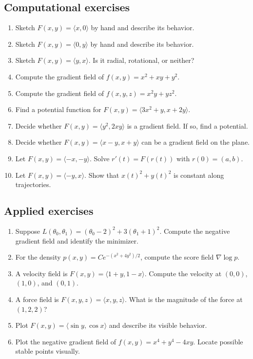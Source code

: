 \documentclass[11pt]{article}
\newcommand{\grad}{\nabla}
\begin{document}
\subsection*{Computational exercises}
\begin{enumerate}
  \item Sketch $F(x,y)=\langle x,0\rangle$ by hand and describe its behavior.
  \item Sketch $F(x,y)=\langle 0,y\rangle$ by hand and describe its behavior.
  \item Sketch $F(x,y)=\langle y,x\rangle$. Is it radial, rotational, or neither?
  \item Compute the gradient field of $f(x,y)=x^2+xy+y^2$.
  \item Compute the gradient field of $f(x,y,z)=x^2y+yz^2$.
  \item Find a potential function for $F(x,y)=\langle 3x^2+y,x+2y\rangle$.
  \item Decide whether $F(x,y)=\langle y^2,2xy\rangle$ is a gradient field. If so, find a potential.
  \item Decide whether $F(x,y)=\langle x-y,x+y\rangle$ can be a gradient field on the plane.
  \item Let $F(x,y)=\langle -x,-y\rangle$. Solve $r'(t)=F(r(t))$ with $r(0)=(a,b)$.
  \item Let $F(x,y)=\langle -y,x\rangle$. Show that $x(t)^2+y(t)^2$ is constant along trajectories.
\end{enumerate}

\subsection*{Applied exercises}
\begin{enumerate}
  \item Suppose $L(\theta_0,\theta_1)=(\theta_0-2)^2+3(\theta_1+1)^2$. Compute the negative gradient field and identify the minimizer.
  \item For the density $p(x,y)=Ce^{-(x^2+4y^2)/2}$, compute the score field $\grad\log p$.
  \item A velocity field is $F(x,y)=\langle 1+y,1-x\rangle$. Compute the velocity at $(0,0)$, $(1,0)$, and $(0,1)$.
  \item A force field is $F(x,y,z)=\langle x,y,z\rangle$. What is the magnitude of the force at $(1,2,2)$?
  \item Plot $F(x,y)=\langle \sin y,\cos x\rangle$ and describe its visible behavior.
  \item Plot the negative gradient field of $f(x,y)=x^4+y^4-4xy$. Locate possible stable points visually.
\end{enumerate}
\end{document}
